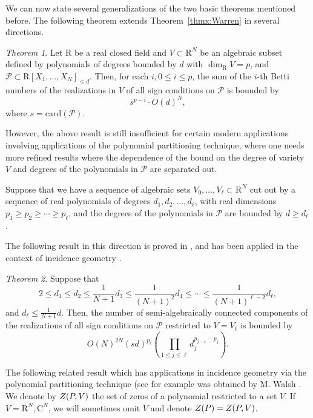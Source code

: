 \documentclass[10pt]{amsart}
\theoremstyle{definition}
\theoremstyle{remark}
\newtheorem{thmx}{Theorem}
\numberwithin{equation}{section}
\newcommand {\R} {\mathrm{R}}
\newcommand {\C}     {\mathrm{C}}
\newcommand {\ZZ} {{\rm Z}}
\newcommand{\card}{\mathrm{card}}
\begin{document}
We can now state several generalizations of the two basic theorems mentioned before.
The following theorem
extends Theorem~\ref{thmx:Warren} in 
several directions.


\begin{thmx}\cite{BPR02}
\label{thmx:BPR}
Let $\R$ be a real closed field and $V \subset \R^N$ be an algebraic subset defined by polynomials of degrees bounded by $d$ with $\dim_\R V = p$, and $\mathcal{P} \subset \R[X_1,\ldots,X_N]_{\leq d}$. Then, for each $i, 0 \leq i \leq p$, the sum of the $i$-th Betti numbers of the realizations in $V$ of all sign conditions on $\mathcal{P}$ is bounded by 
\[
s^{p-i} \cdot O(d)^N,
\]
where $s = \card(\mathcal{P})$.
\end{thmx}

However, the above result is still insufficient for certain modern applications involving applications of the polynomial partitioning technique, where one needs more refined results where the dependence
of the bound on the degree of variety $V$ and degrees of the polynomials
in $\mathcal{P}$ are separated out. 

Suppose that we have a sequence of algebraic sets $V_0,\ldots,V_\ell \subset \R^N$
cut out by a sequence of real polynomials of degrees
$d_1,d_2, \ldots,d_\ell$, with real dimensions
$p_1 \geq p_2 \geq \cdots \geq p_\ell$,
and the degrees of the polynomials in $\mathcal{P}$ are bounded by $d \geq d_\ell$.

The following result in this direction is proved in \cite{Barone-Basu2},
and has been applied in the context of incidence geometry \cite{Basu-Sombra, Walsh1, Walsh2}.


\begin{thmx} \cite[Theorem 4]{Barone-Basu2}
\label{thmx:BB}
Suppose that
\[ 2 \leq d_1 \leq d_2 \leq \frac{1}{N + 1} d_3 \leq \frac{1}{(N + 1)^2} d_4
   \leq \cdots \leq \frac{1}{(N + 1)^{\ell - 2}} d_{\ell},\]
   and $d_\ell \leq \frac{1}{N+1} d$.
   Then, the number of semi-algebraically connected components of the realizations of all sign conditions on $\mathcal{P}$ restricted to $V = V_\ell$ is bounded by
 \[
  O (N)^{2 N} (s d)^{p_{\ell}}  \left( \prod_{1 \leq j \leq \ell}
    d_j^{p_{j - 1} - p_j} \right) .
\]
\end{thmx}

The following related result which has applications in incidence geometry via the polynomial partitioning technique (see for example \cite{Guth-book,Sheffer-book} was obtained by M. Walsh \cite{Walsh2}. We denote by $\ZZ(P,V)$ the set of zeros of a polynomial restricted to a
set $V$. 
If $V = \R^N,\C^N$, we will sometimes omit $V$ and denote $\ZZ(P) = \ZZ(P,V)$.
\end{document}
